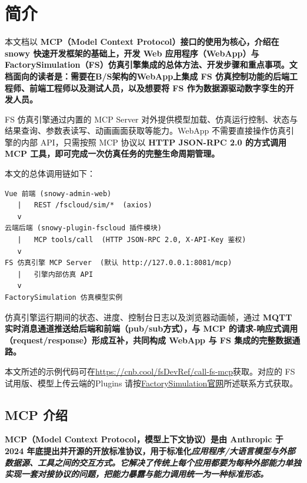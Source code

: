 \section{简介}
本文档以 \bf{MCP（Model Context Protocol）}接口的使用为核心，介绍在 \bf{snowy} 快速开发框架的基础上，开发 \bf{Web 应用程序（WebApp）}与 \bf{FactorySimulation（FS）}仿真引擎集成的总体方法、开发步骤和重点事项。文档面向的读者是：需要在B/S架构的WebApp上集成 FS 仿真控制功能的后端工程师、前端工程师以及测试人员，以及想要将 FS 作为数据源驱动数字孪生的开发人员。

FS 仿真引擎通过内置的 MCP Server 对外提供模型加载、仿真运行控制、状态与结果查询、参数表读写、动画画面获取等能力。WebApp 不需要直接操作仿真引擎的内部 API，只需按照 MCP 协议以 \bf{HTTP JSON-RPC 2.0} 的方式调用 MCP 工具，即可完成一次仿真任务的完整生命周期管理。

本文的总体调用链如下：
\begin{lstlisting}
Vue 前端 (snowy-admin-web)
   |   REST /fscloud/sim/*  (axios)
   v
云端后端 (snowy-plugin-fscloud 插件模块)
   |   MCP tools/call  (HTTP JSON-RPC 2.0, X-API-Key 鉴权)
   v
FS 仿真引擎 MCP Server  (默认 http://127.0.0.1:8081/mcp)
   |   引擎内部仿真 API
   v
FactorySimulation 仿真模型实例
\end{lstlisting}\vspace{-30pt}
\par 仿真引擎运行期间的状态、进度、控制台日志以及浏览器动画帧，通过 \bf{MQTT} 实时消息通道推送给后端和前端（pub/sub方式），与 MCP 的请求-响应式调用（request/response）形成互补，共同构成 WebApp 与 FS 集成的完整数据通路。

本文所述的示例代码可在\url{https://cnb.cool/fsDevRef/call-fs-mcp}获取。对应的 FS 试用版、模型上传云端的Plugins 请按\href{https://www.factorysimulation.cn/}{FactorySimulation官网}所述联系方式获取。

\subsection{MCP 介绍}
\bf{MCP（Model Context Protocol，模型上下文协议）}是由 Anthropic 于 2024 年底提出并开源的开放标准协议，用于标准化\it{应用程序/大语言模型}与\it{外部数据源、工具}之间的交互方式。它解决了传统上每个应用都要为每种外部能力单独实现一套对接协议的问题，把\it{能力暴露}与\it{能力调用}统一为一种标准形态。

